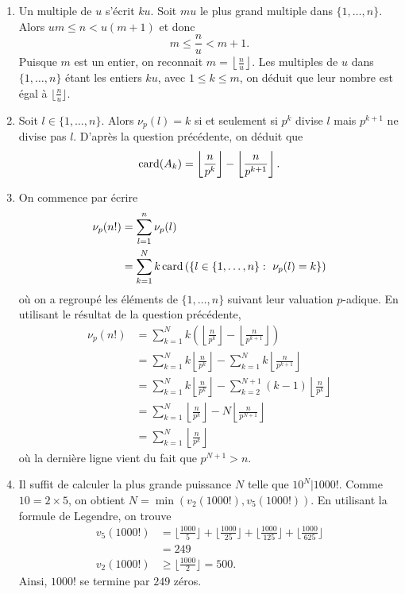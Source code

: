 \documentclass[11pt,a4paper]{article}
\begin{document}
	\begin{corrige}
		\begin{enumerate}
			
			\item  Un multiple de $u$ s'écrit $ku$. Soit $mu$ le plus grand multiple dans $\{1,\dots,n\}$. Alors $um\leq n<u(m+1)$ et donc
			$$m\leq \frac nu <m+1.$$
			Puisque $m$ est un entier, on reconnait $m=\left\lfloor \frac nu\right\rfloor$. Les multiples de $u$ dans $\{1,\dots,n\}$ étant les entiers $ku$, avec $1\leq k\leq m$, on déduit que leur nombre est égal à $\lfloor \frac nu\rfloor.$
			
			\item  Soit $l\in\{1,\dots,n\}$. Alors $\nu_p(l)=k$ si et seulement si $p^k$ divise $l$ mais $p^{k+1}$ ne divise pas $l$. D'après la question précédente, on déduit que 
			$$\operatorname{card}(A_k)=\left\lfloor \frac n{p^k}\right\rfloor-\left\lfloor \frac n{p^{k+1}}\right\rfloor.$$
			
			\item  On commence par écrire 
			\begin{align*}
				\nu_p(n!)&=\sum_{l=1}^n \nu_p(l)\\
				&=\sum_{k=1}^N k \card\left(\{l\in\{1,\dots,n\}:\ \nu_p(l)=k\}\right)
			\end{align*}
			où on a regroupé les éléments de $\{1,\dots,n\}$ suivant leur valuation $p$-adique. En utilisant le résultat de la question précédente,
			\begin{align*}
				\nu_p(n!)&=\sum_{k=1}^N k \left(\left\lfloor \frac n{p^k}\right\rfloor-\left\lfloor \frac n{p^{k+1}}\right\rfloor\right)\\
				&=\sum_{k=1}^N  k \left\lfloor \frac n{p^k}\right\rfloor-\sum_{k=1}^N k \left\lfloor \frac n{p^{k+1}}\right\rfloor\\
				&=\sum_{k=1}^N  k \left\lfloor \frac n{p^k}\right\rfloor-\sum_{k=2}^{N+1} (k-1) \left\lfloor \frac n{p^{k}}\right\rfloor\\
				&=\sum_{k=1}^N \left\lfloor \frac n{p^k}\right\rfloor-N \left\lfloor\frac{n}{p^{N+1}}\right\rfloor\\
				&=\sum_{k=1}^N \left\lfloor \frac n{p^k}\right\rfloor
			\end{align*}
			où la dernière ligne vient du fait que $p^{N+1}>n$.
			
			\item  Il suffit de calculer la plus grande puissance $N$ telle que $10^N|1000!$.
			Comme $10=2\times 5$, on obtient $N=\min(v_2(1000!),v_5(1000!))$. En utilisant la formule de Legendre, on trouve
			\begin{align*}
				v_5(1000!)&=\Big\lfloor\frac{1000}5\Big\rfloor+\Big\lfloor \frac{1000}{25}\Big\rfloor+\Big\lfloor \frac{1000}{125}\Big\rfloor+\Big\lfloor \frac{1000}{625}\Big\rfloor\\
				&=249\\
				v_2(1000!)&\geq \Big\lfloor\frac{1000}{2}\Big\rfloor=500.
			\end{align*}
			Ainsi, $1000!$ se termine par $249$ zéros.
			
		\end{enumerate}
	\end{corrige}
	
\end{document}

